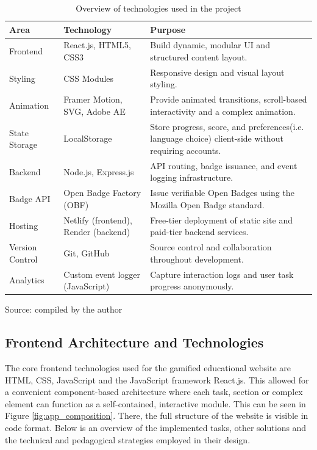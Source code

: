 \begin{table}[H]
\centering
\captionsetup{justification=raggedright, singlelinecheck=false}
\caption{Overview of technologies used in the project}
\renewcommand{\arraystretch}{1.3}
\begin{tabularx}{\textwidth}{|l|l|X|}
\hline
\textbf{Area} & \textbf{Technology} & \textbf{Purpose} \\
\hline
Frontend & React.js, HTML5, CSS3 & Build dynamic, modular UI and structured content layout. \\
\hline
Styling & CSS Modules & Responsive design and visual layout styling. \\
\hline
Animation & Framer Motion, SVG, Adobe AE & Provide animated transitions, scroll-based interactivity and a complex animation. \\
\hline
State Storage & LocalStorage & Store progress, score, and preferences(i.e. language choice) client-side without requiring accounts. \\
\hline
Backend & Node.js, Express.js & API routing, badge issuance, and event logging infrastructure. \\
\hline
Badge API & Open Badge Factory (OBF) & Issue verifiable Open Badges using the Mozilla Open Badge standard. \\
\hline
Hosting & Netlify (frontend), Render (backend) & Free-tier deployment of static site and paid-tier backend services. \\
\hline
Version Control & Git, GitHub & Source control and collaboration throughout development. \\
\hline
Analytics & Custom event logger (JavaScript) & Capture interaction logs and user task progress anonymously. \\
\hline
\end{tabularx}
\label{tab:tech_stack}
\end{table}
 {\raggedright \small{Source: compiled by the author}\par}

\subsection{Frontend Architecture and Technologies}

The core frontend technologies used for the gamified educational website are HTML, CSS, JavaScript and the JavaScript framework React.js. 
This allowed for a convenient component-based architecture where each task, section or complex element can function as a self-contained, interactive module. 
This can be seen in Figure \ref{fig:app_composition}. 
There, the full structure of the website is visible in code format.
Below is an overview of the implemented tasks, other solutions and the technical and pedagogical strategies employed in their design.

